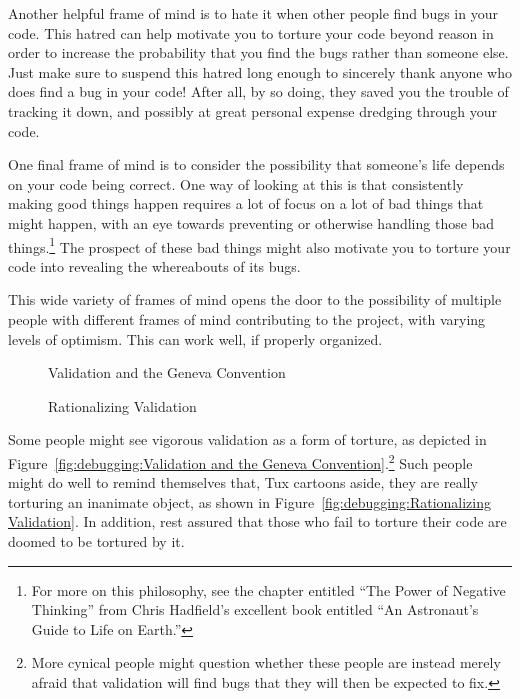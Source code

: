 Another helpful frame of mind is to hate it when other people find bugs in
your code.
This hatred can help motivate you to torture your code beyond reason
in order to increase the probability that you find the bugs rather than
someone else.
Just make sure to suspend this hatred long enough to sincerely thank
anyone who does find a bug in your code!
After all, by so doing, they saved you the trouble of tracking it down,
and possibly at great personal expense dredging through your code.

One final frame of mind is to consider the possibility that someone's
life depends on your code being correct.
One way of looking at this is that consistently making good things happen
requires a lot of focus on a lot of bad things that might happen, with
an eye towards preventing or otherwise handling those bad things.\footnote{
	For more on this philosophy, see the chapter entitled
	``The Power of Negative Thinking''
	from Chris Hadfield's excellent book entitled
	``An Astronaut's Guide to Life on Earth.''}
The prospect of these bad things might also motivate you to torture your
code into revealing the whereabouts of its bugs.

This wide variety of frames of mind opens the door to
the possibility of multiple people with different frames of
mind contributing to the project, with varying levels of optimism.
This can work well, if properly organized.

\begin{figure}[tb]
\centering
{}
\caption{Validation and the Geneva Convention}
\end{figure}

\begin{figure}[tb]
\centering
{}
\caption{Rationalizing Validation}
\end{figure}

Some people might see vigorous validation as a form of torture, as
depicted in
Figure~\ref{fig:debugging:Validation and the Geneva Convention}.\footnote{
	More cynical people might question whether these people are instead
	merely afraid that validation will find bugs that they will then
	be expected to fix.}
Such people might do well to remind themselves that, Tux cartoons aside,
they are really torturing an inanimate object, as shown in
Figure~\ref{fig:debugging:Rationalizing Validation}.
In addition, rest assured that those who fail to torture their code are
doomed to be tortured by it.

